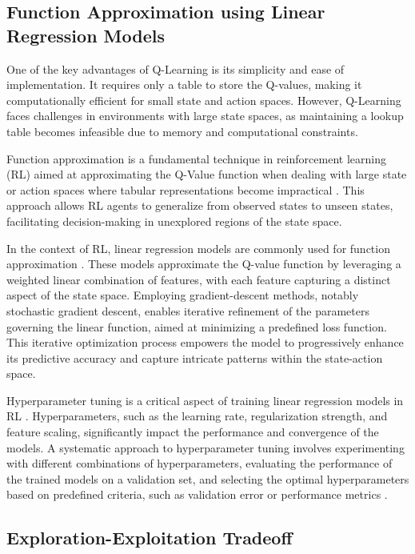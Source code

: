 \subsection{Function Approximation using Linear Regression Models}

One of the key advantages of Q-Learning is its simplicity and ease of implementation. It requires only a table to store the Q-values, making it computationally efficient for small state and action spaces. However, Q-Learning faces challenges in environments with large state spaces, as maintaining a lookup table becomes infeasible due to memory and computational constraints.

Function approximation is a fundamental technique in reinforcement learning (RL) aimed at approximating the Q-Value function when dealing with large state or action spaces where tabular representations become impractical \cite{russel2020ai}. This approach allows RL agents to generalize from observed states to unseen states, facilitating decision-making in unexplored regions of the state space.

In the context of RL, linear regression models are commonly used for function approximation \cite{sutton2018reinforcement}.  These models approximate the Q-value function by leveraging a weighted linear combination of features, with each feature capturing a distinct aspect of the state space. Employing gradient-descent methods, notably stochastic gradient descent, enables iterative refinement of the parameters governing the linear function, aimed at minimizing a predefined loss function. This iterative optimization process empowers the model to progressively enhance its predictive accuracy and capture intricate patterns within the state-action space.

Hyperparameter tuning is a critical aspect of training linear regression models in RL \cite{bergstra2012random}. Hyperparameters, such as the learning rate, regularization strength, and feature scaling, significantly impact the performance and convergence of the models. A systematic approach to hyperparameter tuning involves experimenting with different combinations of hyperparameters, evaluating the performance of the trained models on a validation set, and selecting the optimal hyperparameters based on predefined criteria, such as validation error or performance metrics \cite{russel2020ai}.

\subsection{Exploration-Exploitation Tradeoff}


